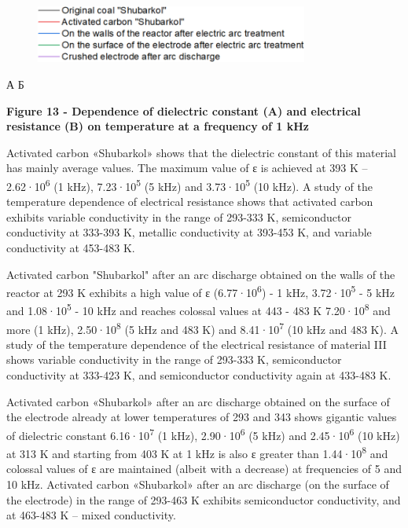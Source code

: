 \begin{figure}[H]
	\centering
	\includegraphics[width=0.8\textwidth]{assets/66}
	\caption*{}
\end{figure}

А Б

{\bfseries Figure 13 - Dependence of dielectric constant (A) and electrical
resistance (B) on temperature at a frequency of 1 kHz}

Activated carbon «Shubarkol» shows that the dielectric constant of this
material has mainly average values. The maximum value of ε is achieved
at 393 K -- 2.62·10\textsuperscript{6} (1 kHz),
7.23·10\textsuperscript{5} (5 kHz) and 3.73·10\textsuperscript{5} (10
kHz). A study of the temperature dependence of electrical resistance
shows that activated carbon exhibits variable conductivity in the range
of 293-333 K, semiconductor conductivity at 333-393 K, metallic
conductivity at 393-453 K, and variable conductivity at 453-483 K.

Activated carbon "Shubarkol" after an arc discharge obtained on the
walls of the reactor at 293 K exhibits a high value of ε
(6.77·10\textsuperscript{6}) - 1 kHz, 3.72·10\textsuperscript{5} - 5 kHz
and 1.08·10\textsuperscript{5} - 10 kHz and reaches colossal values
\hspace{0pt}\hspace{0pt}at 443 - 483 K 7.20·10\textsuperscript{8} and
more (1 kHz), 2.50·10\textsuperscript{8} (5 kHz and 483 K) and
8.41·10\textsuperscript{7} (10 kHz and 483 K). A study of the
temperature dependence of the electrical resistance of material III
shows variable conductivity in the range of 293-333 K, semiconductor
conductivity at 333-423 K, and semiconductor conductivity again at
433-483 K.

Activated carbon «Shubarkol» after an arc discharge obtained on the
surface of the electrode already at lower temperatures of 293 and 343
shows gigantic values \hspace{0pt}\hspace{0pt}of dielectric constant
6.16·10\textsuperscript{7} (1 kHz), 2.90·10\textsuperscript{6} (5 kHz)
and 2.45·10\textsuperscript{6} (10 kHz) at 313 K and starting from 403 K
at 1 kHz is also ε greater than 1.44·10\textsuperscript{8} and colossal
values \hspace{0pt}\hspace{0pt}of ε are maintained (albeit with a
decrease) at frequencies of 5 and 10 kHz. Activated carbon «Shubarkol»
after an arc discharge (on the surface of the electrode) in the range of
293-463 K exhibits semiconductor conductivity, and at 463-483 K -- mixed
conductivity.

